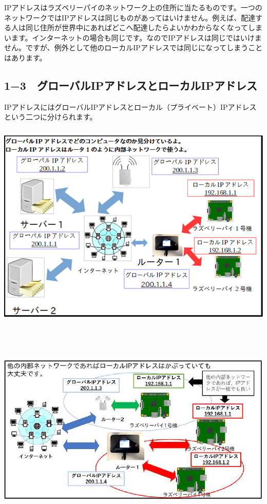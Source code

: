\documentclass[a4paper,12pt,dvipdfmx]{jarticle}
\begin{document}
\bigskip


\bigskip


\bigskip


\bigskip


\bigskip


\bigskip


\bigskip

IPアドレスはラズベリーパイのネットワーク上の住所に当たるものです。一つのネットワークではIPアドレスは同じものがあってはいけません。例えば、配達する人は同じ住所が世界中にあればどこへ配達したらよいかわからなくなってしまいます。インターネットの場合も同じです。なのでIPアドレスは同じではいけません。ですが、例外として他のローカルIPアドレスでは同じになってしまうことはあります。%

\clearpage\subsection*{\bfseries
1−3　グローバルIPアドレスとローカルIPアドレス}
IPアドレスにはグローバルIPアドレスとローカル（プライベート）IPアドレスという二つに分けられます。



\centering
\includegraphics[width=15.0cm,height=10.0cm]{ome7-img005.png}

\centering
\includegraphics[width=15.0cm,height=10.0cm]{ome7-img006}
\flushleft
\end{document}
